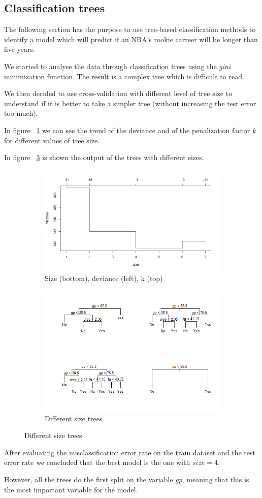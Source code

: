 \subsection{Classification trees}

The following section has the purpose to use tree-based classification methods to identify a model which will predict if an NBA's rookie carreer will be longer than five years.

We started to analyse the data through classification trees using the \textit{gini} minimization function. The result is a complex tree which is difficult to read.

We then decided to use cross-validation with different level of tree size to understand if it is better to take a simpler tree (without increasing the test error too much).

In figure \Fig~\ref{fig:tree_cv_plot} we can see the trend of the deviance and of the penalization factor \textit{k} for different values of tree size.

In figure \Fig~\ref{fig:tree_prune_comparison} is shown the output of the trees with different sizes.

\begin{figure}[h]
	\centering
	\begin{subfigure}{.6\textwidth}
		\centering
		\includegraphics[width=0.5\linewidth]{ImageFiles/Classification/Trees/tree_cv_plot}
		\caption{Size (bottom), deviance (left), k (top)}
		\label{fig:tree_cv_plot}
	\end{subfigure}%
	\begin{subfigure}{.6\textwidth}
		\centering
		\includegraphics[width=0.5\linewidth]{ImageFiles/Classification/Trees/tree_prune_comparison}
		\caption{Different size trees}
		\label{fig:tree_prune_comparison}
	\end{subfigure}
\end{figure}

After evaluating the misclassification error rate on the train dataset and the test error rate we concluded that the best model is the one with $size = 4$.

However, all the trees do the first split on the variable \textit{gp}, meaning that this is the most important variable for the model.
